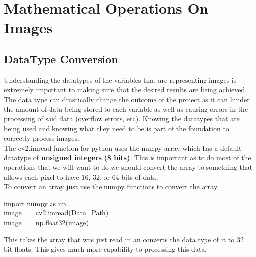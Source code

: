 \documentclass[fleqn]{article}
\begin{document}
    \newpage

    \section{Mathematical Operations On Images}
    \subsection{DataType Conversion}
    Understanding the datatypes of the variables that are representing images is extremely important to making sure that the desired results are being achieved. The data type can drastically change the outcome of the project as it can hinder the amount of data being stored to each variable as well as causing errors in the processing of said data (overflow errors, etc). Knowing the datatypes that are being used and knowing what they need to be is part of the foundation to correctly process images.\\
    The cv2.imread function for python uses the numpy array which has a default datatype of \textbf{unsigned integers (8 bits)}. This is important as to do most of the operations that we will want to do we should convert the array to something that allows each pixel to have 16, 32, or 64 bits of data. \\
    To convert an array just use the numpy functions to convert the array.
    \begin{center}
        import numpy as np\\
        image $=$ cv2.imread(Data\_Path)\\
        image $=$ np.float32(image)\\
    \end{center}
    This takes the array that was just read in an converts the data type of it to 32 bit floats. This gives much more capability to processing this data.\\
\end{document}
